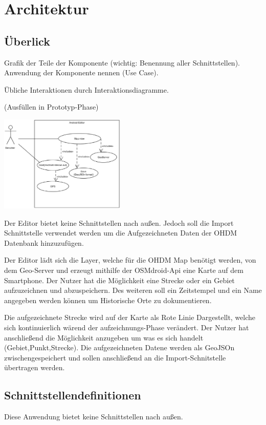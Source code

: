 \section{Architektur}

\subsection{Überlick}
Grafik der Teile der Komponente (wichtig: Benennung aller Schnittstellen). 
Anwendung der Komponente nennen (Use Case).

Übliche Interaktionen durch Interaktionsdiagramme.

(Ausfüllen in Prototyp-Phase)

\includegraphics[width=0.45\textwidth]{UseCase}

Der Editor bietet keine Schnittstellen nach außen. Jedoch soll die Import Schnittstelle verwendet werden um die Aufgezeichneten Daten der OHDM Datenbank hinzuzufügen.

Der Editor lädt sich die Layer, welche für die OHDM Map benötigt werden, von dem Geo-Server und erzeugt mithilfe der OSMdroid-Api eine Karte auf dem Smartphone. Der Nutzer hat die Möglichkeit eine Strecke oder ein Gebiet aufzuzeichnen und abzuspeichern. Des weiteren soll ein Zeitstempel und ein Name angegeben werden können um Historische Orte zu dokumentieren.

Die aufgezeichnete Strecke wird auf der Karte als Rote Linie Dargestellt, welche sich kontinuierlich wärend der aufzeichnungs-Phase verändert. Der Nutzer hat anschließend die Möglichkeit anzugeben um was es sich handelt (Gebiet,Punkt,Strecke). Die aufgezeichneten Datene werden als GeoJSOn zwischengespeichert und sollen anschließend an die Import-Schnitstelle übertragen werden.

\subsection{Schnittstellendefinitionen}

Diese Anwendung bietet keine Schnittstellen nach außen.

